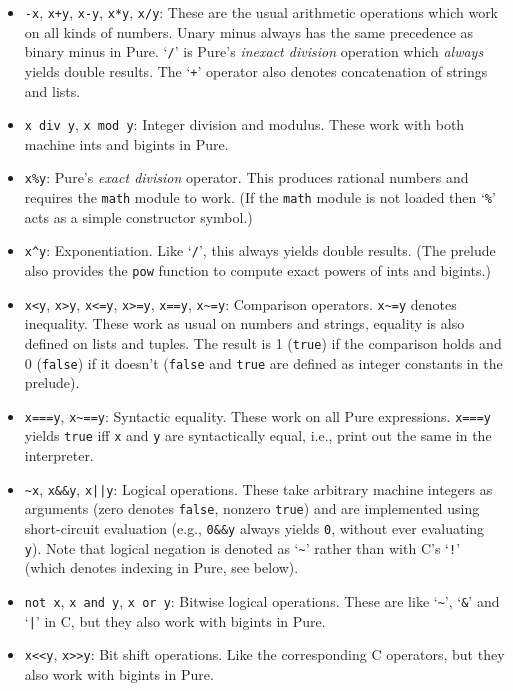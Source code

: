 \documentclass[a4paper,12pt]{article}
\begin{document}
\begin{itemize}
\item \verb|-x|, \verb|x+y|, \verb|x-y|, \verb|x*y|, \verb|x/y|: These are the usual arithmetic operations which work on all kinds of numbers. Unary minus always has the same precedence as binary minus in Pure. `\verb|/|' is Pure's \emph{inexact division} operation which \emph{always} yields double results. The `\verb|+|' operator also denotes concatenation of strings and lists.
\item \verb|x div y|, \verb|x mod y|: Integer division and modulus. These work with both machine ints and bigints in Pure.
\item \verb|x%y|: Pure's \emph{exact division} operator. This produces rational numbers and requires the \verb|math| module to work. (If the \verb|math| module is not loaded then `\verb|%|' acts as a simple constructor symbol.)
\item \verb|x^y|: Exponentiation. Like `\verb|/|', this always yields double results. (The prelude also provides the \verb|pow| function to compute exact powers of ints and bigints.)
\item \verb|x<y|, \verb|x>y|, \verb|x<=y|, \verb|x>=y|, \verb|x==y|, \verb|x~=y|: Comparison operators. \verb|x~=y| denotes inequality. These work as usual on numbers and strings, equality is also defined on lists and tuples. The result is 1 (\verb|true|) if the comparison holds and 0 (\verb|false|) if it doesn't (\verb|false| and \verb|true| are defined as integer constants in the prelude).
\item \verb|x===y|, \verb|x~==y|: Syntactic equality. These work on all Pure expressions. \verb|x===y| yields \verb|true| iff \verb|x| and \verb|y| are syntactically equal, i.e., print out the same in the interpreter.
\item \verb|~x|, \verb|x&&y|, \verb?x||y?: Logical operations. These take arbitrary machine integers as arguments (zero denotes \verb|false|, nonzero \verb|true|) and are implemented using short-circuit evaluation (e.g., \verb|0&&y| always yields \verb|0|, without ever evaluating \verb|y|). Note that logical negation is denoted as `\verb|~|' rather than with C's `\verb|!|' (which denotes indexing in Pure, see below).
\item \verb|not x|, \verb|x and y|, \verb|x or y|: Bitwise logical operations. These are like `\verb|~|', `\verb|&|' and `\verb?|?' in C, but they also work with bigints in Pure.
\item \verb|x<<y|, \verb|x>>y|: Bit shift operations. Like the corresponding C operators, but they also work with bigints in Pure.
\end{itemize}
\end{document}

